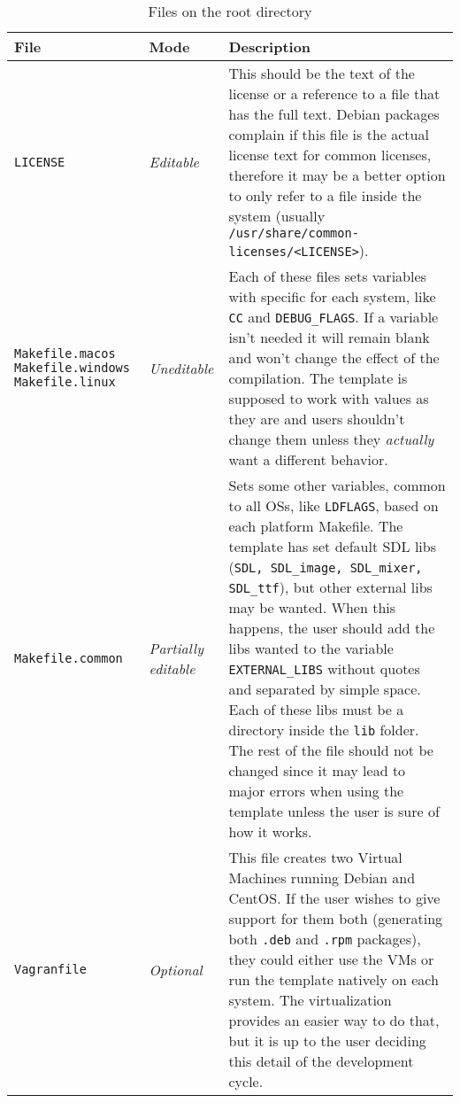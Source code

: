 \begin{longtable}{p{3cm}p{2cm}p{10cm}}

\caption{Files on the root directory}\label{tab:files_root_dir}\\
\toprule
\textbf{File} & \textbf{Mode} & \textbf{Description} \\
\midrule
\endhead



\texttt{LICENSE} & \emph{Editable} & This should be the text of the license or a reference to a file that has the full text. Debian packages complain if this file is the actual license text for common licenses, therefore it may be a better option to only refer to a file inside the system (usually \texttt{/usr/share/common-licenses/<LICENSE>}). \\ \hline
\texttt{Makefile.macos} \texttt{Makefile.windows} \texttt{Makefile.linux} & \emph{Uneditable} & Each of these files sets variables with specific for each system, like \texttt{CC} and \texttt{DEBUG\_FLAGS}. If a variable isn't needed it will remain blank and won't change the effect of the compilation. The template is supposed to work with values as they are and users shouldn't change them unless they \emph{actually} want a different behavior. \\ \hline
\texttt{Makefile.common} & \emph{Partially editable} & Sets some other variables, common to all OSs, like \texttt{LDFLAGS}, based on each platform Makefile. The template has set default SDL libs (\texttt{SDL, SDL\_image, SDL\_mixer, SDL\_ttf}), but other external libs may be wanted. When this happens, the user should add the libs wanted to the variable \texttt{EXTERNAL\_LIBS} without quotes and separated by simple space. Each of these libs must be a directory inside the \texttt{lib} folder. The rest of the file should not be changed since it may lead to major errors when using the template unless the user is sure of how it works. \\ \hline
\texttt{Vagranfile} & \emph{Optional} & This file creates two Virtual Machines running Debian and CentOS. If the user wishes to give support for them both (generating both \texttt{.deb} and \texttt{.rpm} packages), they could either use the VMs or run the template natively on each system. The virtualization provides an easier way to do that, but it is up to the user deciding this detail of the development cycle. \\ \hline

\end{longtable}
